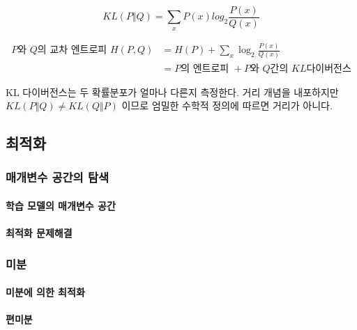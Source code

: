 \documentclass [12pt] {oblivoir}
\let\oldsubsubsection=\subsubsection
\renewcommand{\subsubsection}
{
  \filbreak
  \oldsubsubsection
}
\begin{document}
\begin{equation} \tag{2.48}
  KL(P \Vert Q) = \sum_{x}P(x)log_{2}\frac{P(x)}{Q(x)}
\end{equation}

\begin{align} \tag{2.49}
  P\text{와 } Q\text{의 교차 엔트로피 } H(P, Q)
  &= H(P) + \sum_{x}\log_{2}\frac{P(x)}{Q(x)} \\
  &= P\text{의 엔트로피 } + P\text{와 } Q\text{간의 } KL\text{다이버전스}
\end{align}

KL 다이버전스는 두 확률분포가 얼마나 다른지 측정한다. 거리 개념을 내포하지만 $KL(P \Vert Q) \neq KL(Q \Vert P)$ 이므로 엄밀한 수학적 정의에 따르면 거리가 아니다.

\vspace{3mm}

\subsection{최적화}

\subsubsection{매개변수 공간의 탐색}

\paragraph*{학습 모델의 매개변수 공간}\mbox{}

\vspace{3mm}

\paragraph*{최적화 문제해결}\mbox{}

\vspace{3mm}

\subsubsection{미분}

\paragraph*{미분에 의한 최적화}\mbox{}

\vspace{3mm}

\paragraph*{편미분}\mbox{}
\end{document}
